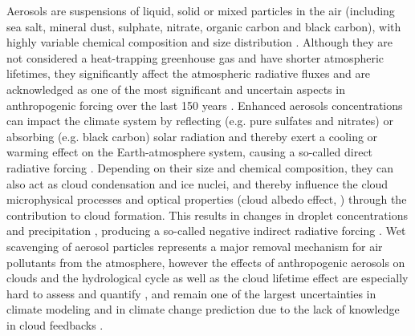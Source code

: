 \noindent 
Aerosols are  suspensions of liquid,  solid or mixed particles  in the
air  (including sea  salt,  mineral dust,  sulphate, nitrate,  organic
carbon and  black carbon),  with highly variable  chemical composition
and  size  distribution \citep{Putaud-2010}.   Although  they are  not
considered a heat-trapping greenhouse gas and have shorter atmospheric
lifetimes, they significantly  affect the atmospheric radiative fluxes
and  are acknowledged  as one  of the  most significant  and uncertain
aspects    in    anthropogenic    forcing    over   the    last    150
years \citep{Koch-2009,  IPCC-2013}.  Enhanced aerosols concentrations
can impact the  climate system by reflecting (e.g.   pure sulfates and
nitrates)  or  absorbing  (e.g.   black carbon)  solar  radiation  and
thereby  exert a  cooling or  warming effect  on  the Earth-atmosphere
system,      causing       a      so-called      direct      radiative
forcing     \citep{Charlson-1991,    Haywood-2000,    Ramanathan-2001,
Liao-2005, Bangert-2012, Lundgren-2013}.   Depending on their size and
chemical composition, they can also  act as cloud condensation and ice
nuclei, and  thereby influence  the cloud microphysical  processes and
optical   properties  (cloud  albedo   effect,  \citealp{Twomey-1977})
through the contribution to  cloud formation.  This results in changes
in      droplet      concentrations     \citep{Albrecht-1989}      and
precipitation     \citep{Rosenfeld-2000,    Khain-2008,    Khain-2009,
Pruppacher-2010,   Seifert-2012,  Tao-2012,  Lee-2012},   producing  a
so-called  negative  indirect  radiative forcing  \citep{Haywood-2000,
Lohmann-2005,  VandenHeever-2011, Rosenfeld-2013}.  Wet  scavenging of
aerosol  particles  represents  a  major  removal  mechanism  for  air
pollutants from  the atmosphere, however the  effects of anthropogenic
aerosols on  clouds and  the hydrological cycle  as well as  the cloud
lifetime    effect    are    especially    hard    to    assess    and
quantify   \citep{IPCC-2013},   and   remain   one  of   the   largest
uncertainties in climate modeling and in climate change prediction due
to  the lack  of  knowledge in  cloud feedbacks  \citep{Sherwood-2013,
Rosenfeld-2013, Lee-2013}. \\

